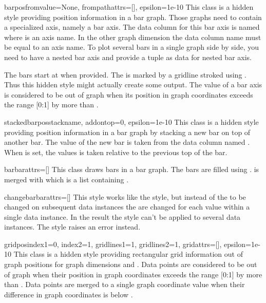 \begin{classdesc}{barpos}{fromvalue=None, frompathattrs=[], epsilon=1e-10} %
  This class is a hidden style providing position information in a bar
  graph. Those graphs need to contain a specialized axis, namely a bar
  axis. The data column for this bar axis is named  where
   is an axis name. In the other graph dimension the data
  column name must be equal to an axis name. To plot several bars in a
  single graph side by side, you need to have a nested bar axis and
  provide a tuple as data for nested bar axis.

  The bars start at  when provided. The 
  is marked by a gridline stroked using . Thus this
  hidden style might actually create some output. The value of a bar
  axis is considered to be out of graph when its position in graph
  coordinates exceeds the range [0:1] by more than .
\end{classdesc} %

\begin{classdesc}{stackedbarpos}{stackname, addontop=0, epsilon=1e-10} %
  This class is a hidden style providing position information in a bar
  graph by stacking a new bar on top of another bar. The value of the
  new bar is taken from the data column named . When
   is set, the values is taken relative to the previous
  top of the bar.
\end{classdesc} %

\begin{classdesc}{bar}{barattrs=[]} %
  This class draws bars in a bar graph. The bars are filled using
  .  is merged with 
  which is a list containing .
\end{classdesc} %

\begin{classdesc}{changebar}{barattrs=[]} %
  This style works like the  style, but instead of the
   to be changed on subsequent data instances the
   are changed for each value within a single data
  instance. In the result the style can't be applied to several data
  instances. The style raises an error instead.
\end{classdesc} %

\begin{classdesc}{gridpos}{index1=0, index2=1, %
                        gridlines1=1, gridlines2=1, gridattrs=[],
                        epsilon=1e-10}
  This class is a hidden style providing rectangular grid information
  out of graph positions for graph dimensions  and
  . Data points are considered to be out of graph when
  their position in graph coordinates exceeds the range [0:1] by more
  than . Data points are merged to a single graph
  coordinate value when their difference in graph coordinates is below
  .
\end{classdesc} %


